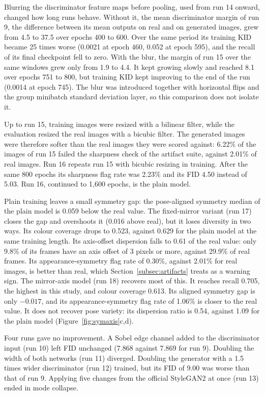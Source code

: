 \documentclass[electronics,article,submit,pdftex,moreauthors]{Definitions/mdpi}
\begin{document}
Blurring the discriminator feature maps before pooling, used from run 14
onward, changed how long runs behave. Without it, the mean discriminator
margin of run 9, the difference between its mean outputs on real and on
generated images, grew from 4.5 to 37.5 over epochs 400 to 600. Over the same
period its training KID became 25 times worse (0.0021 at epoch 460, 0.052 at
epoch 595), and the recall of its final checkpoint fell to zero. With the
blur, the margin of run 15 over the same windows grew only from 1.9 to 4.4.
It kept growing slowly and reached 8.1 over epochs 751 to 800, but training
KID kept improving to the end of the run (0.0014 at epoch 745). The blur was
introduced together with horizontal flips and the group minibatch standard
deviation layer, so this comparison does not isolate it.

Up to run 15, training images were resized with a bilinear filter, while the
evaluation resized the real images with a bicubic filter. The generated
images were therefore softer than the real images they were scored against:
6.22\% of the images of run 15 failed the sharpness check of the artifact
suite, against 2.01\% of real images. Run 16 repeats run 15 with bicubic
resizing in training. After the same 800 epochs its sharpness flag rate was
2.23\% and its FID 4.50 instead of 5.03. Run 16, continued to 1,600 epochs,
is the plain model.

Plain training leaves a small symmetry gap: the pose-aligned symmetry median
of the plain model is 0.059 below the real value. The fixed-mirror variant
(run 17) closes the gap and overshoots it (0.016 above real), but it loses
diversity in two ways. Its colour coverage drops to 0.523, against 0.629 for
the plain model at the same training length. Its axis-offset dispersion falls
to 0.61 of the real value: only 9.8\% of its frames have an axis offset of 3
pixels or more, against 29.9\% of real frames. Its appearance-symmetry flag
rate of 0.30\%, against 2.01\% for real images, is better than real, which
Section~\ref{subsec:artifacts} treats as a warning sign. The mirror-axis
model (run 18) recovers most of this. It reaches recall 0.705, the highest in
this study, and colour coverage 0.613. Its aligned symmetry gap is only
$-0.017$, and its appearance-symmetry flag rate of 1.06\% is closer to the
real value. It does not recover pose variety: its dispersion ratio is 0.54,
against 1.09 for the plain model (Figure~\ref{fig:symaxis}c,d).

Four runs gave no improvement. A Sobel edge channel added to the
discriminator input (run 10) left FID unchanged (7.868 against 7.869 for
run 9). Doubling the width of both networks (run 11) diverged. Doubling the
generator with a 1.5 times wider discriminator (run 12) trained, but its FID
of 9.00 was worse than that of run 9. Applying five changes from the official
StyleGAN2 at once (run 13) ended in mode collapse.
\end{document}
